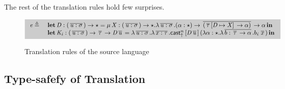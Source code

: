 The rest of the translation rules hold few surprises.

\begin{figure*}
\ottdefnctxtrans{}\ottinterrule
\ottdefnpgmtrans{}\ottinterrule
\ottdefndecltrans{}
\[\hlmath{\ottdecltrans}\]\ottinterrule %
\ottdefnpattrans{}\ottinterrule
\ottdefnexprtrans{}
\caption{Translation rules of the source language}
\label{fig:source:translate}
\end{figure*}

\subsection{Type-safefy of Translation}








